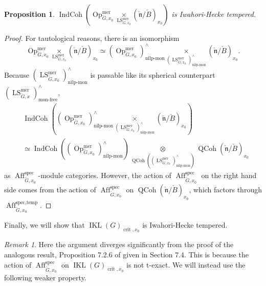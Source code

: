 \documentclass[10pt]{amsart}
\newtheorem{prop}[subsubsection]{Proposition}
\theoremstyle{remark}
\newtheorem{rem}[subsubsection]{Remark}
\newcommand{\on}[1]{\operatorname{#1}}
\newcommand{\QCoh}{\on{QCoh}}
\newcommand{\IndCoh}{\on{IndCoh}}
\newcommand{\IKLx}{\on{IKL}(G)_{\on{crit}, x_0}}
\newcommand{\Gcheck}{\check{G}}
\newcommand{\ncheck}{\check{\mathfrak{n}}}
\newcommand{\Bcheck}{\check{B}}
\begin{document}
\begin{prop}
    $\IndCoh(\on{Op}_{\Gcheck, x_0}^{\on{mer}} \underset{\on{LS}_{\Gcheck, x_0}^{\on{mer}}}{\times} (\ncheck/\Bcheck)_{x_0})$ is Iwahori-Hecke tempered.
\end{prop}
\begin{proof}
For tautological reasons, there is an isomorphism
    $$
    \on{Op}_{\Gcheck, x_0}^{\on{mer}} \underset{\on{LS}_{\Gcheck, x_0}^{\on{mer}}}{\times} (\ncheck/\Bcheck)_{x_0} \simeq (\on{Op}_{\Gcheck, x_0}^{\on{mer}})_{\on{nilp-mon}}^{\wedge} \underset{(\on{LS}_{\Gcheck, x_0}^{\on{mer}})_{\on{nilp-mon}}^{\wedge}}{\times} (\ncheck/\Bcheck)_{x_0}.
    $$
    Because $(\on{LS}_{\Gcheck, x_0}^{\on{mer}})_{\on{nilp-mon}}^{\wedge}$ is passable like its spherical counterpart $(\on{LS}_{\Gcheck, x}^{\on{mer}})_{\on{mon-free}}^{\wedge}$,
    \begin{align}
    &\IndCoh((\on{Op}_{\Gcheck, x_0}^{\on{mer}})_{\on{nilp-mon}}^{\wedge} \underset{(\on{LS}_{\Gcheck, x_0}^{\on{mer}})_{\on{nilp-mon}}^{\wedge}}{\times} (\ncheck/\Bcheck)_{x_0}) \\ &\simeq \IndCoh((\on{Op}_{\Gcheck, x_0}^{\on{mer}})_{\on{nilp-mon}}^{\wedge}) \underset{\QCoh((\on{LS}_{\Gcheck, x_0}^{\on{mer}})_{\on{nilp-mon}}^{\wedge})}{\otimes} \QCoh(\ncheck/\Bcheck)_{x_0}
    \end{align}
    as $\on{Aff}_{\Gcheck, x_0}^{\on{spec}}$-module categories. However, the action of $\on{Aff}_{\Gcheck, x_0}^{\on{spec}}$ on the right hand side comes from the action of $\on{Aff}_{\Gcheck, x_0}^{\on{spec}}$ on $\QCoh(\ncheck/\Bcheck)_{x_0}$, which factors through $\on{Aff}_{\Gcheck, x_0}^{\on{spec, temp}}$.
\end{proof}

Finally, we will show that $\IKLx$ is Iwahori-Hecke tempered.

\begin{rem}
    Here the argument diverges significantly from the proof of the analogous result, Proposition 7.2.6 of \cite{GLC2} given in Section 7.4. This is because the action of $\on{Aff}_{\Gcheck, x_0}^{\on{spec}}$ on $\IKLx$ is not t-exact. We will instead use the following weaker property.
\end{rem}
\end{document}
